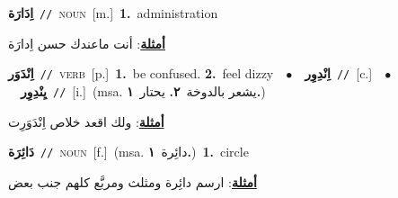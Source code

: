 \documentclass[10pt,a4paper,twoside]{article} %
\begin{document}
\begin{multicols}{2}
{\setlength\topsep{0pt}\textbf{\foreignlanguage{arabic}{اِدَارَة}}\ {\color{gray}\texttt{//}\color{black}}\ \textsc{noun}\ [m.]\ \textbf{1.}~administration\  \begin{flushright}\color{gray}\foreignlanguage{arabic}{\textbf{\underline{\foreignlanguage{arabic}{أمثلة}}}: أنت ماعندك حسن اِدارَة}\end{flushright}\color{black}} \vspace{2mm}

{\setlength\topsep{0pt}\textbf{\foreignlanguage{arabic}{اِنْدَوَر}}\ {\color{gray}\texttt{//}\color{black}}\ \textsc{verb}\ [p.]\ \textbf{1.}~be confused.  \textbf{2.}~feel dizzy\ \ $\bullet$\ \ \setlength\topsep{0pt}\textbf{\foreignlanguage{arabic}{اِنْدِوِر}}\ {\color{gray}\texttt{//}\color{black}}\ [c.]\ \ $\bullet$\ \ \setlength\topsep{0pt}\textbf{\foreignlanguage{arabic}{يِنْدِوِر}}\ {\color{gray}\texttt{//}\color{black}}\ [i.]\ \color{gray}(msa. \foreignlanguage{arabic}{يشعر بالدوخة}~\foreignlanguage{arabic}{\textbf{٢.}}  \foreignlanguage{arabic}{يحتار}~\foreignlanguage{arabic}{\textbf{١.}})\color{black}\  \begin{flushright}\color{gray}\foreignlanguage{arabic}{\textbf{\underline{\foreignlanguage{arabic}{أمثلة}}}: ولك اقعد خلاص اِنْدَوَرِت}\end{flushright}\color{black}} \vspace{2mm}

{\setlength\topsep{0pt}\textbf{\foreignlanguage{arabic}{دَائِرَة}}\ {\color{gray}\texttt{//}\color{black}}\ \textsc{noun}\ [f.]\ \color{gray}(msa. \foreignlanguage{arabic}{دائِرة}~\foreignlanguage{arabic}{\textbf{١.}})\color{black}\ \textbf{1.}~circle\  \begin{flushright}\color{gray}\foreignlanguage{arabic}{\textbf{\underline{\foreignlanguage{arabic}{أمثلة}}}: ارسم دائِرة ومثلث ومربَّع كلهم جنب بعض}\end{flushright}\color{black}} \vspace{2mm}


\end{multicols}
\end{document}
